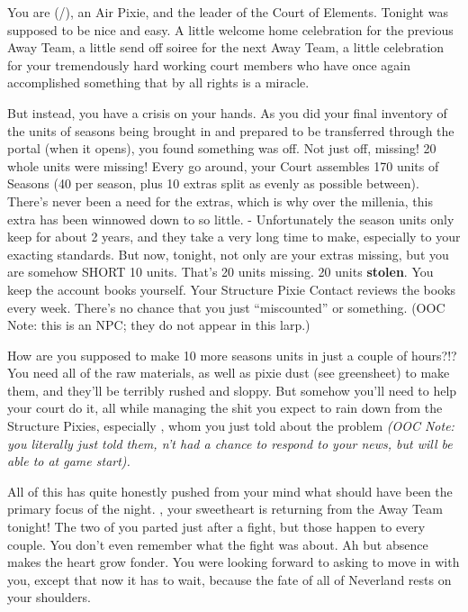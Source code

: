 \documentclass[char]{PP}
\begin{document}
\name{\cEHead{}}

You are \cEHead{} (\cEHead{\They}/\cEHead{\Them}), an Air Pixie, and the leader of the Court of Elements. Tonight was supposed to be nice and easy. A little welcome home celebration for the previous Away Team, a little send off soiree for the next Away Team, a little celebration for your tremendously hard working court members who have once again accomplished something that by all rights is a miracle.

But instead, you have a crisis on your hands. As you did your final inventory of the units of seasons being brought in and prepared to be transferred through the portal (when it opens), you found something was off. Not just off, missing! 20 whole units were missing! Every go around, your Court assembles 170 units of Seasons (40 per season, plus 10 extras split as evenly as possible between). There's never been a need for the extras, which is why over the millenia, this extra has been winnowed down to so little. - Unfortunately the season units only keep for about 2 years, and they take a very long time to make, especially to your exacting standards. But now, tonight, not only are your extras missing, but you are somehow SHORT 10 units. That's 20 units missing. 20 units \textbf{stolen}. You keep the account books yourself. Your Structure Pixie Contact reviews the books every week. There's no chance that you just “miscounted” or something. (OOC Note: this is an NPC; they do not appear in this larp.)

How are you supposed to make 10 more seasons units in just a couple of hours?!? You need all of the raw materials, as well as pixie dust (see greensheet) to make them, and they'll be terribly rushed and sloppy. But somehow you'll need to help your court do it, all while managing the shit you expect to rain down from the Structure Pixies, especially \cSHead{}, whom you just told about the problem \textit{(OOC Note: you literally just told them, \cSHead{\they} \cSHead{\have}n't had a chance to respond to your news, but will be able to at game start).}

All of this has quite honestly pushed from your mind what should have been the primary focus of the night. \cELove{}, your sweetheart is returning from the Away Team tonight! The two of you parted just after a fight, but those happen to every couple. You don't even remember what the fight was about. Ah but absence makes the heart grow fonder. You were looking forward to asking  \cELove{} to move in with you, except that now it has to wait, because the fate of all of Neverland rests on your shoulders.
\end{document}

